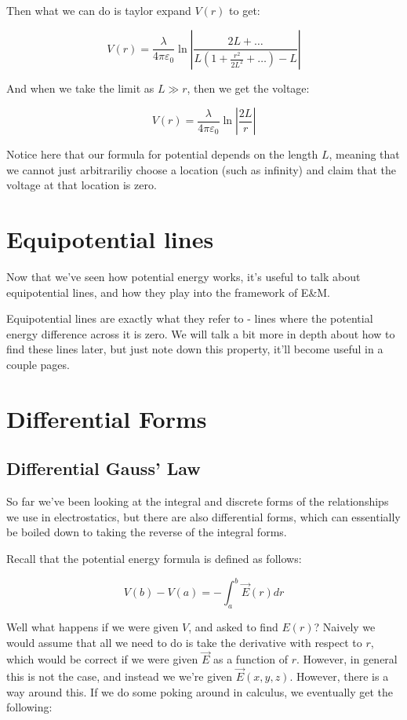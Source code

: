 \documentclass{report}
\theoremstyle{definition}
\numberwithin{equation}{section}
\numberwithin{definition}{section}
\begin{document}
\begin{example}
        Then what we can do is taylor expand $V(r)$ to get:

        \[V(r) = \frac{\lambda}{4\pi\varepsilon_0}\ln\left|\frac{2L + \dots}{L\left(1 + \frac{r^2}{2L^2} + \dots\right) - L}\right|\]

        And when we take the limit as $L \gg r$, then we get the voltage: 

        \[ V(r) = \frac{\lambda}{4\pi\varepsilon_0}\ln\left|\frac{2L}{r}\right|\]

        Notice here that our formula for potential depends on the length $L$, meaning that we cannot just arbitrariliy choose a location (such as infinity) and claim that the voltage at that location is zero.
    \end{example}

    \section{Equipotential lines}

    Now that we've seen how potential energy works, it's useful to talk about equipotential lines, and how they play into the framework of E\&M. 

    Equipotential lines are exactly what they refer to - lines where the potential energy difference across it is zero. We will talk a bit more in depth about how to find these lines later, but just note down this property, it'll become useful in a couple pages.

    \section{Differential Forms}

    \subsection{Differential Gauss' Law}

    So far we've been looking at the integral and discrete forms of the relationships we use in electrostatics, but there are also differential forms, which can essentially be boiled down to taking the reverse of the integral forms. 

    Recall that the potential energy formula is defined as follows:

    \[ V(b) - V(a) = -\int_a^b \vec{E}(r) dr\]

    Well what happens if we were given $V$, and asked to find $E(r)$? Naively we would assume that all we need to do is take the derivative with respect to $r$, which would be correct if we were given $\vec{E}$ as a function of $r$. However, in general this is not the case, and instead we we're given $\vec{E}(x, y, z)$. However, there is a way around this. If we do some poking around in calculus, we eventually get the following:
\end{document}
